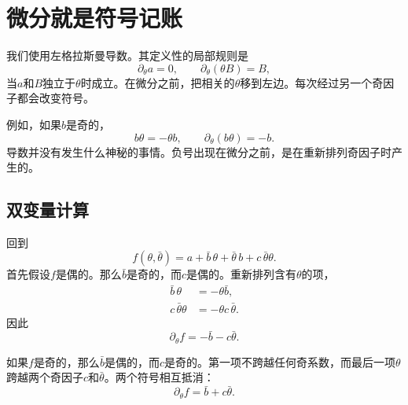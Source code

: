 \section{微分就是符号记账}

我们使用左格拉斯曼导数。其定义性的局部规则是
\begin{equation}
\partial_\theta a=0,
\qquad
\partial_\theta(\theta B)=B,
\end{equation}
当\(a\)和\(B\)独立于\(\theta\)时成立。在微分之前，把相关的\(\theta\)移到左边。每次经过另一个奇因子都会改变符号。

例如，如果\(b\)是奇的，
\begin{equation}
b\theta=-\theta b,
\qquad
\partial_\theta(b\theta)=-b.
\end{equation}
导数并没有发生什么神秘的事情。负号出现在微分之前，是在重新排列奇因子时产生的。

\subsection{双变量计算}

回到
\begin{equation}
f(\theta,\bar\theta)
=a+\bar b\,\theta+\bar\theta\,b+c\,\bar\theta\theta.
\end{equation}
首先假设\(f\)是偶的。那么\(\bar b\)是奇的，而\(c\)是偶的。重新排列含有\(\theta\)的项，
\begin{align}
\bar b\,\theta&=-\theta\bar b,\\
c\,\bar\theta\theta&=-\theta c\,\bar\theta.
\end{align}
因此
\begin{equation}
\partial_\theta f=-\bar b-c\bar\theta.
\end{equation}

如果\(f\)是奇的，那么\(\bar b\)是偶的，而\(c\)是奇的。第一项不跨越任何奇系数，而最后一项\(\theta\)跨越两个奇因子\(c\)和\(\bar\theta\)。两个符号相互抵消：
\begin{equation}
\partial_\theta f=\bar b+c\bar\theta.
\end{equation}

\begin{classroomqa}
\end{classroomqa}

